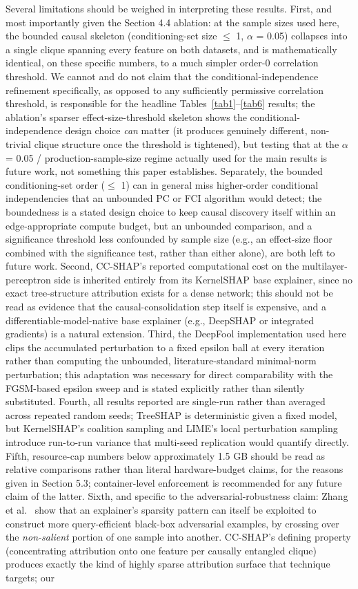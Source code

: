 Several limitations should be weighed in interpreting these results. First, and most importantly given the Section 4.4 ablation: at the sample sizes used here, the bounded causal skeleton (conditioning-set size $\leq$ 1, $\alpha$ = 0.05) collapses into a single clique spanning every feature on both datasets, and is mathematically identical, on these specific numbers, to a much simpler order-0 correlation threshold. We cannot and do not claim that the conditional-independence refinement specifically, as opposed to any sufficiently permissive correlation threshold, is responsible for the headline Tables~\ref{tab1}--\ref{tab6} results; the ablation's sparser effect-size-threshold skeleton shows the conditional-independence design choice \emph{can} matter (it produces genuinely different, non-trivial clique structure once the threshold is tightened), but testing that at the $\alpha$ = 0.05 / production-sample-size regime actually used for the main results is future work, not something this paper establishes. Separately, the bounded conditioning-set order ($\leq$ 1) can in general miss higher-order conditional independencies that an unbounded PC or FCI algorithm would detect; the boundedness is a stated design choice to keep causal discovery itself within an edge-appropriate compute budget, but an unbounded comparison, and a significance threshold less confounded by sample size (e.g., an effect-size floor combined with the significance test, rather than either alone), are both left to future work. Second, CC-SHAP's reported computational cost on the multilayer-perceptron side is inherited entirely from its KernelSHAP base explainer, since no exact tree-structure attribution exists for a dense network; this should not be read as evidence that the causal-consolidation step itself is expensive, and a differentiable-model-native base explainer (e.g., DeepSHAP or integrated gradients) is a natural extension. Third, the DeepFool implementation used here clips the accumulated perturbation to a fixed epsilon ball at every iteration rather than computing the unbounded, literature-standard minimal-norm perturbation; this adaptation was necessary for direct comparability with the FGSM-based epsilon sweep and is stated explicitly rather than silently substituted. Fourth, all results reported are single-run rather than averaged across repeated random seeds; TreeSHAP is deterministic given a fixed model, but KernelSHAP's coalition sampling and LIME's local perturbation sampling introduce run-to-run variance that multi-seed replication would quantify directly. Fifth, resource-cap numbers below approximately 1.5 GB should be read as relative comparisons rather than literal hardware-budget claims, for the reasons given in Section 5.3; container-level enforcement is recommended for any future claim of the latter. Sixth, and specific to the adversarial-robustness claim: Zhang et al.~\citep{ref32} show that an explainer's sparsity pattern can itself be exploited to construct more query-efficient black-box adversarial examples, by crossing over the \emph{non-salient} portion of one sample into another. CC-SHAP's defining property (concentrating attribution onto one feature per causally entangled clique) produces exactly the kind of highly sparse attribution surface that technique targets; our 